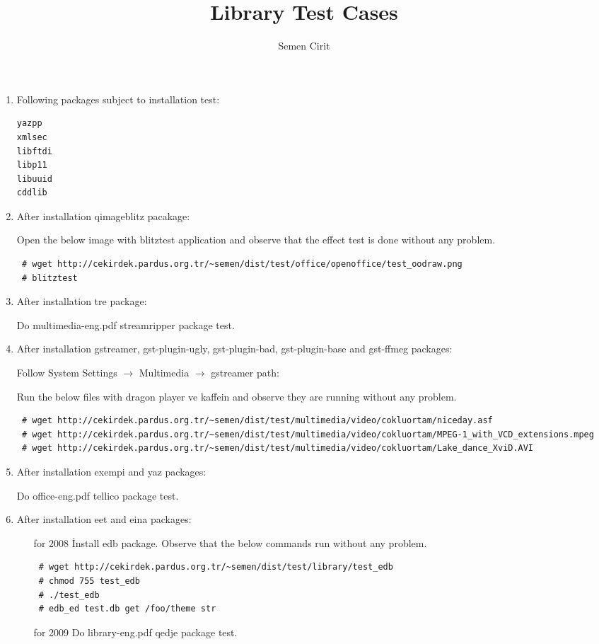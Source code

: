\documentclass[a4paper,10pt]{article}
\title{Library Test Cases}
\author{Semen Cirit}
\begin{document}
\maketitle
\begin{enumerate}
\item  Following packages subject to installation test:
\begin{verbatim}
yazpp
xmlsec
libftdi
libp11
libuuid
cddlib
\end{verbatim}

\item After installation qimageblitz pacakage:

Open the below image with blitztest application and observe that the effect test is done without any problem.
\begin{verbatim}
 # wget http://cekirdek.pardus.org.tr/~semen/dist/test/office/openoffice/test_oodraw.png
 # blitztest
\end{verbatim}


\item After installation tre package:

Do multimedia-eng.pdf streamripper package test.

\item After installation gstreamer, gst-plugin-ugly, gst-plugin-bad, gst-plugin-base and gst-ffmeg packages:

Follow System Settings $\rightarrow$ Multimedia $\rightarrow$ gstreamer path:

Run the below files with dragon player ve kaffein and observe they are running without any problem.
\begin{verbatim}
 # wget http://cekirdek.pardus.org.tr/~semen/dist/test/multimedia/video/cokluortam/niceday.asf
 # wget http://cekirdek.pardus.org.tr/~semen/dist/test/multimedia/video/cokluortam/MPEG-1_with_VCD_extensions.mpeg
 # wget http://cekirdek.pardus.org.tr/~semen/dist/test/multimedia/video/cokluortam/Lake_dance_XviD.AVI
\end{verbatim}

\item After installation exempi and yaz packages:

Do office-eng.pdf tellico package test.

\item After installation eet and eina packages: 
\begin{itemize}
 \item [for 2008] İnstall edb package. Observe that the below commands run without any problem.
\begin{verbatim}
 # wget http://cekirdek.pardus.org.tr/~semen/dist/test/library/test_edb
 # chmod 755 test_edb
 # ./test_edb
 # edb_ed test.db get /foo/theme str
\end{verbatim}
\item [for 2009] Do library-eng.pdf qedje package test.
\end{itemize}


\end{enumerate}
\end{document}
